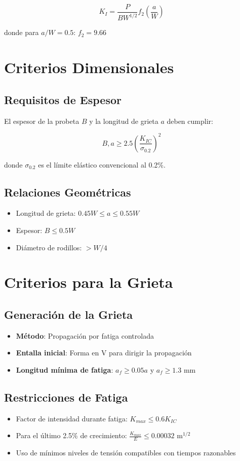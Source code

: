 \documentclass[12pt,letterpaper]{article}
\begin{document}
\[K_I = \frac{P}{BW^{1/2}} f_2\left(\frac{a}{W}\right)\]

donde para $a/W = 0.5$: $f_2 = 9.66$

\section{Criterios Dimensionales}

\subsection{Requisitos de Espesor}
El espesor de la probeta $B$ y la longitud de grieta $a$ deben cumplir:

\[B, a \geq 2.5\left(\frac{K_{IC}}{\sigma_{0.2}}\right)^2\]

donde $\sigma_{0.2}$ es el límite elástico convencional al 0.2\%.

\subsection{Relaciones Geométricas}
\begin{itemize}
\item Longitud de grieta: $0.45W \leq a \leq 0.55W$
\item Espesor: $B \leq 0.5W$
\item Diámetro de rodillos: $> W/4$
\end{itemize}

\section{Criterios para la Grieta}

\subsection{Generación de la Grieta}
\begin{itemize}
\item \textbf{Método}: Propagación por fatiga controlada
\item \textbf{Entalla inicial}: Forma en V para dirigir la propagación
\item \textbf{Longitud mínima de fatiga}: $a_f \geq 0.05a$ y $a_f \geq 1.3$ mm
\end{itemize}

\subsection{Restricciones de Fatiga}
\begin{itemize}
\item Factor de intensidad durante fatiga: $K_{max} \leq 0.6 K_{IC}$
\item Para el último 2.5\% de crecimiento: $\frac{K_{max}}{E} \leq 0.00032$ m$^{1/2}$
\item Uso de mínimos niveles de tensión compatibles con tiempos razonables
\end{itemize}
\end{document}
